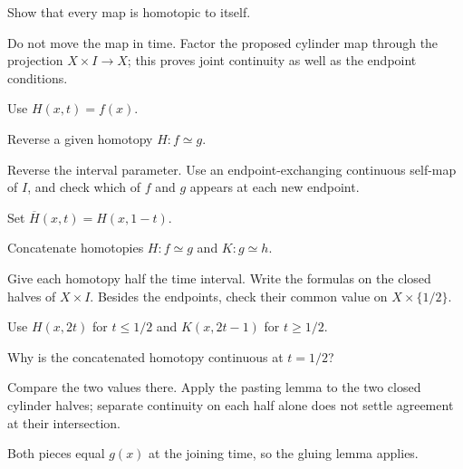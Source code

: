 \begin{exercise}\label{exr:viii01-02}
Show that every map is homotopic to itself.
\end{exercise}
\begin{hint}Do not move the map in time.
Factor the proposed cylinder map through the projection \(X\times I\to X\); this proves joint continuity as well as the endpoint conditions.
\end{hint}
\begin{solution}
Use \(H(x,t)=f(x)\).
\end{solution}

\begin{exercise}\label{exr:viii01-03}
Reverse a given homotopy \(H:f\simeq g\).
\end{exercise}
\begin{hint}Reverse the interval parameter.
Use an endpoint-exchanging continuous self-map of \(I\), and check which of \(f\) and \(g\) appears at each new endpoint.
\end{hint}
\begin{solution}
Set \(\overline H(x,t)=H(x,1-t)\).
\end{solution}

\begin{exercise}\label{exr:viii01-04}
Concatenate homotopies \(H:f\simeq g\) and \(K:g\simeq h\).
\end{exercise}
\begin{hint}Give each homotopy half the time interval.
Write the formulas on the closed halves of \(X\times I\). Besides the endpoints, check their common value on \(X\times\{1/2\}\).
\end{hint}
\begin{solution}
Use \(H(x,2t)\) for \(t\le1/2\) and \(K(x,2t-1)\) for \(t\ge1/2\).
\end{solution}

\begin{exercise}\label{exr:viii01-05}
Why is the concatenated homotopy continuous at \(t=1/2\)?
\end{exercise}
\begin{hint}Compare the two values there.
Apply the pasting lemma to the two closed cylinder halves; separate continuity on each half alone does not settle agreement at their intersection.
\end{hint}
\begin{solution}
Both pieces equal \(g(x)\) at the joining time, so the gluing lemma applies.
\end{solution}

